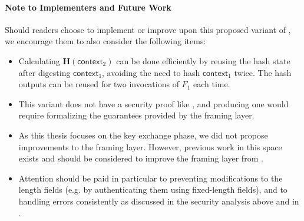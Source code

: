 \paragraph{Note to Implementers and Future Work}

Should readers choose to implement or improve upon this proposed variant of \drivel{}, we encourage them to also consider the following items:

\begin{itemize}
    \item Calculating $\mathbf{H}(\mathsf{context}_2)$ can be done efficiently by reusing the hash state after digesting $\mathsf{context}_1$, avoiding the need to hash $\mathsf{context}_1$ twice. The hash outputs can be reused for two invocations of $F_1$ each time.
    
    \item This variant does not have a security proof like \drivel{}, and producing one would require formalizing the guarantees provided by the framing layer.

    \item As this thesis focuses on the key exchange phase, we did not propose improvements to the framing layer. However, previous work in this space exists \cite{Fenske2024} and should be considered to improve the framing layer from \obfsfour{}.

    \item Attention should be paid in particular to preventing modifications to the length fields (e.g. by authenticating them using fixed-length fields), and to handling errors consistently as discussed in the security analysis above and in \cite[Section~3.3]{Fenske2024}.

\end{itemize}

